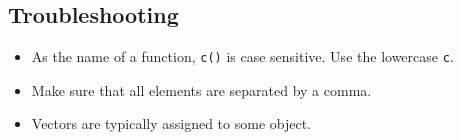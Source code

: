 \documentclass[]{book}
\providecommand{\tightlist}{%
  \setlength{\itemsep}{0pt}\setlength{\parskip}{0pt}}
\begin{document}
\subsection{Troubleshooting}\label{troubleshooting-2}

\begin{itemize}
\tightlist
\item
  As the name of a function, \texttt{c()} is case sensitive. Use the
  lowercase \texttt{c}.
\item
  Make sure that all elements are separated by a comma.
\item
  Vectors are typically assigned to some object.
\end{itemize}


\end{document}
